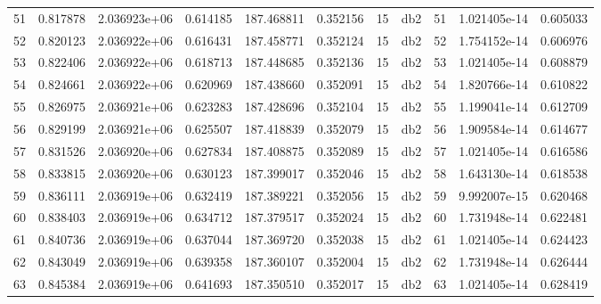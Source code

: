 \begin{tabular}{lrrrrrrlrrr}
51   &    0.817878 &        2.036923e+06 &  0.614185 &              187.468811 &    0.352156 &      15 &          db2 &     51 &   1.021405e-14 &      0.605033 \\
52   &    0.820123 &        2.036922e+06 &  0.616431 &              187.458771 &    0.352124 &      15 &          db2 &     52 &   1.754152e-14 &      0.606976 \\
53   &    0.822406 &        2.036922e+06 &  0.618713 &              187.448685 &    0.352136 &      15 &          db2 &     53 &   1.021405e-14 &      0.608879 \\
54   &    0.824661 &        2.036922e+06 &  0.620969 &              187.438660 &    0.352091 &      15 &          db2 &     54 &   1.820766e-14 &      0.610822 \\
55   &    0.826975 &        2.036921e+06 &  0.623283 &              187.428696 &    0.352104 &      15 &          db2 &     55 &   1.199041e-14 &      0.612709 \\
56   &    0.829199 &        2.036921e+06 &  0.625507 &              187.418839 &    0.352079 &      15 &          db2 &     56 &   1.909584e-14 &      0.614677 \\
57   &    0.831526 &        2.036920e+06 &  0.627834 &              187.408875 &    0.352089 &      15 &          db2 &     57 &   1.021405e-14 &      0.616586 \\
58   &    0.833815 &        2.036920e+06 &  0.630123 &              187.399017 &    0.352046 &      15 &          db2 &     58 &   1.643130e-14 &      0.618538 \\
59   &    0.836111 &        2.036919e+06 &  0.632419 &              187.389221 &    0.352056 &      15 &          db2 &     59 &   9.992007e-15 &      0.620468 \\
60   &    0.838403 &        2.036919e+06 &  0.634712 &              187.379517 &    0.352024 &      15 &          db2 &     60 &   1.731948e-14 &      0.622481 \\
61   &    0.840736 &        2.036919e+06 &  0.637044 &              187.369720 &    0.352038 &      15 &          db2 &     61 &   1.021405e-14 &      0.624423 \\
62   &    0.843049 &        2.036919e+06 &  0.639358 &              187.360107 &    0.352004 &      15 &          db2 &     62 &   1.731948e-14 &      0.626444 \\
63   &    0.845384 &        2.036919e+06 &  0.641693 &              187.350510 &    0.352017 &      15 &          db2 &     63 &   1.021405e-14 &      0.628419 \\

\end{tabular}
